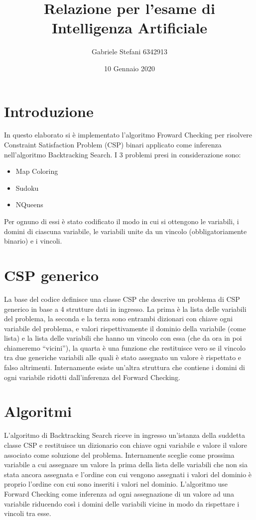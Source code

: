 \documentclass[11pt]{article}
\begin{document}
\title{Relazione per l’esame di\\Intelligenza Artificiale}
\author{Gabriele Stefani 6342913}
\date{10 Gennaio 2020}
\maketitle

\section{Introduzione}
In questo elaborato si è  implementato l’algoritmo Froward Checking per risolvere Constraint Satisfaction Problem (CSP) binari applicato come inferenza nell’algoritmo Backtracking Search.
I 3 problemi presi in considerazione sono: 
\begin{itemize}
  \item Map Coloring
  \item Sudoku
  \item NQueens
\end{itemize}
Per ognuno di essi è stato codificato il modo in cui si ottengono le variabili, i domini di ciascuna variabile,  le variabili unite da un vincolo (obbligatoriamente binario) e i vincoli.

\section{CSP generico}
La base del codice definisce una classe CSP che descrive un problema di CSP generico in base a 4 strutture dati in ingresso. La prima è la lista delle variabili del problema, la seconda e la terza sono entrambi dizionari con chiave ogni variabile del problema, e valori rispettivamente il dominio della variabile (come lista) e la lista delle variabili che hanno un vincolo con essa (che da ora in poi chiameremo “vicini”), la quarta è una funzione che restituisce vero se il vincolo tra due generiche variabili alle quali è stato assegnato un valore è rispettato e falso altrimenti.
Internamente esiste un’altra struttura che contiene i domini di ogni variabile ridotti dall’inferenza del Forward Checking.

\section{Algoritmi}
L’algoritmo di Backtracking Search riceve in ingresso un’istanza della suddetta classe CSP e restituisce un dizionario con chiave ogni variabile e valore il valore associato come soluzione del problema. Internamente sceglie come prossima variabile a cui assegnare un valore la prima della lista delle variabili che non sia stata ancora assegnata e l’ordine con cui vengono assegnati i valori del dominio è proprio l’ordine con cui sono inseriti i valori nel dominio.
L’algoritmo use Forward Checking come inferenza ad ogni assegnazione di un valore ad una variabile riducendo così i domini delle variabili vicine in modo da rispettare i vincoli tra esse.
\end{document}
